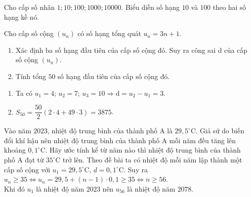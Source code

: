 \begin{bt}%

	Cho cấp số nhân $1; 10; 100; 1000; 10000$. Biểu diễn số hạng $10$ và $100$ theo hai số hạng kề nó.
\end{bt}

\begin{bt}%
    Cho cấp số cộng $\left(u_n\right)$ có số hạng tổng quát $u_n=3 n+1$.
    \begin{enumerate}
        \item Xác định ba số hạng đầu tiên của cấp số cộng đó. Suy ra công sai $\mathrm{d}$ của cấp số cộng $\left(u_n\right)$.
        \item Tính tổng $50$ số hạng đầu tiên của cấp số cộng đó.
    \end{enumerate}
    \loigiai
    {
        \begin{enumerate}
            \item Ta có $
            u_1=4$; $u_2=7$; $u_3=10 \Rightarrow \mathrm{d}=u_2-u_1=3
            $.
            \item $
            S_{50}=\dfrac{50}{2}(2\cdot 4+49\cdot 3)=3875
            $.
        \end{enumerate}
    }
\end{bt}

\begin{bt}%
    Vào năm $2023$, nhiệt độ trung bình của thành phố $\mathrm{A}$ là $29{,}5^{\circ} \mathrm{C}$. Giả sử do biến đổi khí hậu nên nhiệt độ trung bình của thành phố $\mathrm{A}$ mỗi năm đều tăng lên khoảng $0{,}1^{\circ} \mathrm{C}$. Hãy ước tính kể từ năm nào thì nhiệt độ trung bình của thành phố $\mathrm{A}$ đạt từ $35^{\circ} \mathrm{C}$ trở lên.
    \loigiai
    { Theo đề bài ta có nhiệt độ mỗi năm lập thành một cấp số cộng với  $u_1=29{,}5^\circ \mathrm{C},\, d=0{,}1^\circ \mathrm{C}$.
        Suy ra
        $u_n \geq 35 \Leftrightarrow u_n=29{,}5+(n-1) \cdot 0{,}1 \geq 35
        \Leftrightarrow n \geq 56$.\\
        Khi đó $u_1$ là nhiệt độ năm 2023 nên $u_{56}$ là nhiệt độ năm $2078$.
    }
\end{bt}

